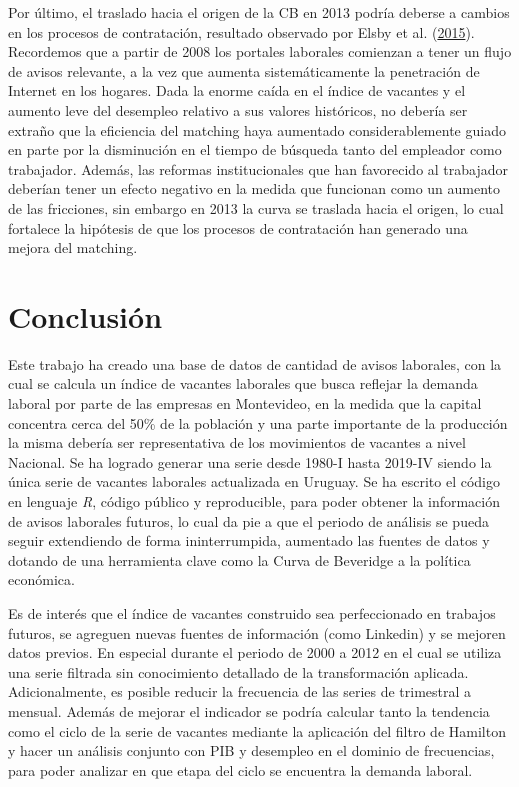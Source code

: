 \documentclass[12pt,oneside]{reedthesis}
\begin{document}
Por último, el traslado hacia el origen de la CB en 2013 podría deberse a cambios en los procesos de contratación, resultado observado por Elsby et al. (\protect\hyperlink{ref-Elsby2015}{2015}). Recordemos que a partir de 2008 los portales laborales comienzan a tener un flujo de avisos relevante, a la vez que aumenta sistemáticamente la penetración de Internet en los hogares. Dada la enorme caída en el índice de vacantes y el aumento leve del desempleo relativo a sus valores históricos, no debería ser extraño que la eficiencia del matching haya aumentado considerablemente guiado en parte por la disminución en el tiempo de búsqueda tanto del empleador como trabajador. Además, las reformas institucionales que han favorecido al trabajador deberían tener un efecto negativo en la medida que funcionan como un aumento de las fricciones, sin embargo en 2013 la curva se traslada hacia el origen, lo cual fortalece la hipótesis de que los procesos de contratación han generado una mejora del matching.

\hypertarget{cap:Conclusiones}{%
\chapter*{Conclusión}\label{cap:Conclusiones}}


Este trabajo ha creado una base de datos de cantidad de avisos laborales, con la cual se calcula un índice de vacantes laborales que busca reflejar la demanda laboral por parte de las empresas en Montevideo, en la medida que la capital concentra cerca del 50\% de la población y una parte importante de la producción la misma debería ser representativa de los movimientos de vacantes a nivel Nacional. Se ha logrado generar una serie desde 1980-I hasta 2019-IV siendo la única serie de vacantes laborales actualizada en Uruguay. Se ha escrito el código en lenguaje \emph{R}, código público y reproducible, para poder obtener la información de avisos laborales futuros, lo cual da pie a que el periodo de análisis se pueda seguir extendiendo de forma ininterrumpida, aumentado las fuentes de datos y dotando de una herramienta clave como la Curva de Beveridge a la política económica.

Es de interés que el índice de vacantes construido sea perfeccionado en trabajos futuros, se agreguen nuevas fuentes de información (como Linkedin) y se mejoren datos previos. En especial durante el periodo de 2000 a 2012 en el cual se utiliza una serie filtrada sin conocimiento detallado de la transformación aplicada. Adicionalmente, es posible reducir la frecuencia de las series de trimestral a mensual. Además de mejorar el indicador se podría calcular tanto la tendencia como el ciclo de la serie de vacantes mediante la aplicación del filtro de Hamilton y hacer un análisis conjunto con PIB y desempleo en el dominio de frecuencias, para poder analizar en que etapa del ciclo se encuentra la demanda laboral.
\end{document}
